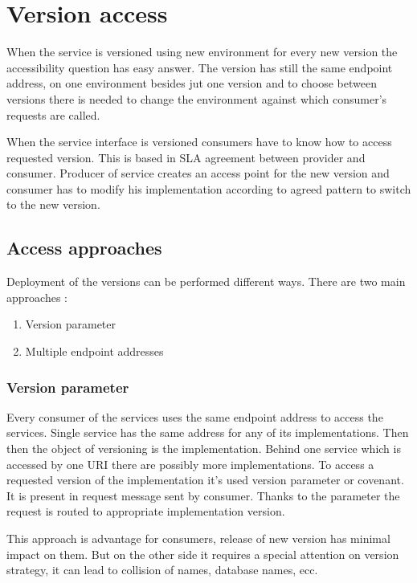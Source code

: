\chapter{Version access}
\label{chap:versionaccess}

When the service is versioned using new environment for every new version the accessibility question has easy answer. The version has still the same endpoint address, on one environment besides jut one version and to choose between versions there is needed to change the environment against which consumer's requests are called. 

When the service interface is versioned consumers have to know how to access requested version. This is based in SLA agreement between provider and consumer. Producer of service creates an access point for the new version and consumer has to modify his implementation according to agreed pattern to switch to the new version. 

\section{Access approaches}
Deployment of the versions can be performed different ways. There are two main approaches \cite{applied-soa}:
\begin{enumerate}
  \item Version parameter
  \item Multiple endpoint addresses
\end{enumerate}

\subsection{Version parameter}
Every consumer of the services uses the same endpoint address to access the services. Single service has the same address for any of its implementations. Then then the object of versioning is the implementation. Behind one service which is accessed by one URI there are possibly more implementations.
To access a requested version of the implementation it's used version parameter or covenant. It is present in request message sent by consumer. Thanks to the parameter the request is routed to appropriate implementation version.

This approach is advantage for consumers, release of new version has minimal impact on them. But on the other side it requires a special attention on version strategy, it can lead to collision of names, database names, ecc.

